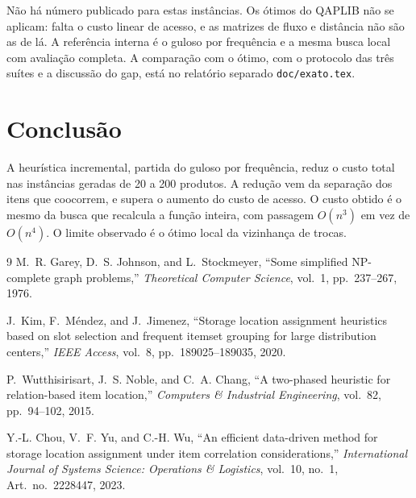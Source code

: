 \documentclass[conference,a4paper]{IEEEtran}
\begin{document}
Não há número publicado para estas instâncias.
Os ótimos do QAPLIB não se aplicam: falta o custo linear de acesso, e as matrizes de fluxo e distância não são as de lá.
A referência interna é o guloso por frequência e a mesma busca local com avaliação completa.
A comparação com o ótimo, com o protocolo das três suítes e a discussão do gap, está no relatório separado \texttt{doc/exato.tex}.

\section{Conclusão}
A heurística incremental, partida do guloso por frequência, reduz o custo total nas instâncias geradas de 20 a 200 produtos.
A redução vem da separação dos itens que coocorrem, e supera o aumento do custo de acesso.
O custo obtido é o mesmo da busca que recalcula a função inteira, com passagem \(O(n^3)\) em vez de \(O(n^4)\).
O limite observado é o ótimo local da vizinhança de trocas.

\begin{thebibliography}{9}
M.~R. Garey, D.~S. Johnson, and L.~Stockmeyer, ``Some simplified NP-complete graph problems,'' \emph{Theoretical Computer Science}, vol.~1, pp.~237--267, 1976.

J.~Kim, F.~Méndez, and J.~Jimenez, ``Storage location assignment heuristics based on slot selection and frequent itemset grouping for large distribution centers,'' \emph{IEEE Access}, vol.~8, pp.~189025--189035, 2020.

P.~Wutthisirisart, J.~S. Noble, and C.~A. Chang, ``A two-phased heuristic for relation-based item location,'' \emph{Computers \& Industrial Engineering}, vol.~82, pp.~94--102, 2015.

Y.-L. Chou, V.~F. Yu, and C.-H. Wu, ``An efficient data-driven method for storage location assignment under item correlation considerations,'' \emph{International Journal of Systems Science: Operations \& Logistics}, vol.~10, no.~1, Art.~no.~2228447, 2023.
\end{thebibliography}
\end{document}
